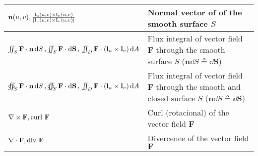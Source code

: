 \begin{xltabular}{\textwidth}{XX}
	\(\mathbf{n}(u,v), \frac{\mathbf{l}_u(u,v)\times\mathbf{l}_v(u,v)}{\abs{\mathbf{l}_u(u,v)\times\mathbf{l}_v(u,v)}}\)                                                                                                                       & Normal vector of of the smooth surface \(S\)                                                                                                                                                                                                                                                                                        \\ \hline
	\(\iint_S \mathbf{F}\cdot \mathbf{n} \dd{S}, \iint_S \mathbf{F} \cdot \dd{\mathbf{S}}, \newline \iint_D \mathbf{F} \cdot (\mathbf{l}_u\times\mathbf{l}_v) \dd{A}\)                                                                         & Flux integral of vector field \(\mathbf{F}\) through the smooth surface \(S\) (\(\mathbf{n} \dd{S} \triangleq \dd{\mathbf{S}}\))                                                                                                                                                                                                    \\ \hline
	\(\oiint_S \mathbf{F}\cdot \mathbf{n} \dd{S}, \oiint_S \mathbf{F} \cdot \dd{\mathbf{S}}, \newline \iint_D \mathbf{F} \cdot (\mathbf{l}_u\times\mathbf{l}_v) \dd{A}\)                                                                       & Flux integral of vector field \(\mathbf{F}\) through the smooth and closed surface \(S\) (\(\mathbf{n} \dd{S} \triangleq \dd{\mathbf{S}}\))                                                                                                                                                                                         \\ \hline
	\(\nabla \times \mathbf{F} , \textnormal{curl } \mathbf{F}\)                                                                                                                                                                               & Curl (rotacional) of the vector field \(\mathbf{F}\)                                                                                                                                                                                                                                                                                \\ \hline
	\(\nabla \cdot \mathbf{F} , \textnormal{div } \mathbf{F}\)                                                                                                                                                                                 & Divercence of the vector field \(\mathbf{F}\)                                                                                                                                                                                                                                                                                       \\ \hline

\end{xltabular}
